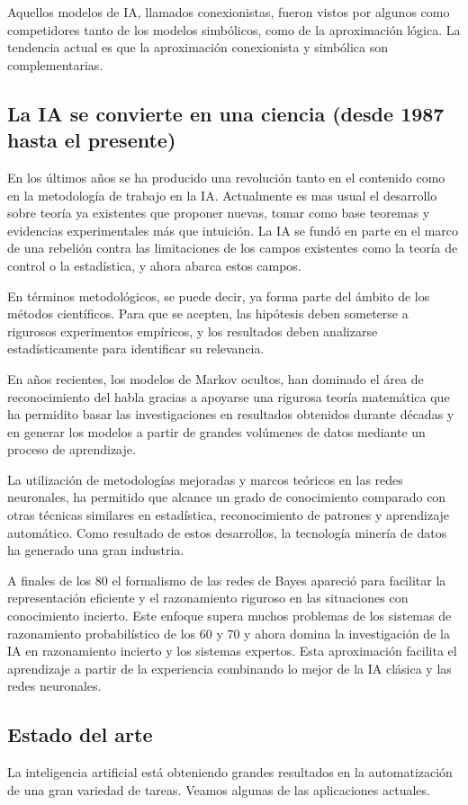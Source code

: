\documentclass[12pt,a4paper]{article}
\begin{document}
Aquellos modelos de IA, llamados conexionistas, fueron vistos por algunos como competidores tanto de los modelos simbólicos, como de la aproximación lógica. La tendencia actual es que la aproximación conexionista y simbólica son complementarias.

\subsection{La IA se convierte en una ciencia (desde 1987 hasta el presente)}
En los últimos años se ha producido una revolución tanto en el contenido como en la metodología de trabajo en la IA. Actualmente es mas usual el desarrollo sobre teoría ya existentes que proponer nuevas, tomar como base teoremas y evidencias experimentales más que intuición. La IA se fundó en parte en el marco de una rebelión contra las limitaciones de los campos existentes como la teoría de control o la estadística, y ahora abarca estos campos.

En términos metodológicos, se puede decir, ya forma parte del ámbito de los métodos científicos. Para que se acepten, las hipótesis deben someterse a rigurosos experimentos empíricos, y los resultados deben analizarse estadísticamente para identificar su relevancia.

En años recientes, los modelos de Markov ocultos, han dominado el área de reconocimiento del habla gracias a apoyarse una rigurosa teoría matemática que ha permidito basar las investigaciones en resultados obtenidos durante décadas y en generar los modelos a partir de grandes volúmenes de datos mediante un proceso de aprendizaje.

La utilización de metodologías mejoradas y marcos teóricos en las redes neuronales, ha permitido que alcance un grado de conocimiento comparado con otras técnicas similares en estadística, reconocimiento de patrones y aprendizaje automático. Como resultado de estos desarrollos, la tecnología minería de datos ha generado una gran industria.

A finales de los 80 el formalismo de las redes de Bayes apareció para facilitar la representación eficiente y el razonamiento riguroso en las situaciones con conocimiento incierto. Este enfoque supera muchos problemas de los sistemas de razonamiento probabilístico de los 60 y 70 y ahora domina la investigación de la IA en razonamiento incierto y los sistemas expertos. Esta aproximación facilita el aprendizaje a partir de la experiencia combinando lo mejor de la IA clásica y las redes neuronales.
\subsection{Estado del arte}
La inteligencia artificial está obteniendo grandes resultados en la automatización de una gran variedad de tareas. Veamos algunas de las aplicaciones actuales.
\end{document}
